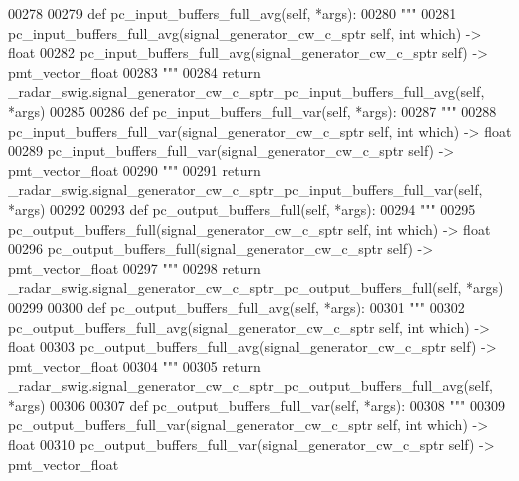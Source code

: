 \begin{DoxyCode}
{{{00278 
00279     \textcolor{keyword}{def }pc_input_buffers_full_avg(self, *args):
00280         \textcolor{stringliteral}{"""}
00281 \textcolor{stringliteral}{        pc\_input\_buffers\_full\_avg(signal\_generator\_cw\_c\_sptr self, int which) -> float}
00282 \textcolor{stringliteral}{        pc\_input\_buffers\_full\_avg(signal\_generator\_cw\_c\_sptr self) -> pmt\_vector\_float}
00283 \textcolor{stringliteral}{        """}
00284         \textcolor{keywordflow}{return} \_radar\_swig.signal\_generator\_cw\_c\_sptr\_pc\_input\_buffers\_full\_avg(self, *args)
00285 
00286     \textcolor{keyword}{def }pc_input_buffers_full_var(self, *args):
00287         \textcolor{stringliteral}{"""}
00288 \textcolor{stringliteral}{        pc\_input\_buffers\_full\_var(signal\_generator\_cw\_c\_sptr self, int which) -> float}
00289 \textcolor{stringliteral}{        pc\_input\_buffers\_full\_var(signal\_generator\_cw\_c\_sptr self) -> pmt\_vector\_float}
00290 \textcolor{stringliteral}{        """}
00291         \textcolor{keywordflow}{return} \_radar\_swig.signal\_generator\_cw\_c\_sptr\_pc\_input\_buffers\_full\_var(self, *args)
00292 
00293     \textcolor{keyword}{def }pc_output_buffers_full(self, *args):
00294         \textcolor{stringliteral}{"""}
00295 \textcolor{stringliteral}{        pc\_output\_buffers\_full(signal\_generator\_cw\_c\_sptr self, int which) -> float}
00296 \textcolor{stringliteral}{        pc\_output\_buffers\_full(signal\_generator\_cw\_c\_sptr self) -> pmt\_vector\_float}
00297 \textcolor{stringliteral}{        """}
00298         \textcolor{keywordflow}{return} \_radar\_swig.signal\_generator\_cw\_c\_sptr\_pc\_output\_buffers\_full(self, *args)
00299 
00300     \textcolor{keyword}{def }pc_output_buffers_full_avg(self, *args):
00301         \textcolor{stringliteral}{"""}
00302 \textcolor{stringliteral}{        pc\_output\_buffers\_full\_avg(signal\_generator\_cw\_c\_sptr self, int which) -> float}
00303 \textcolor{stringliteral}{        pc\_output\_buffers\_full\_avg(signal\_generator\_cw\_c\_sptr self) -> pmt\_vector\_float}
00304 \textcolor{stringliteral}{        """}
00305         \textcolor{keywordflow}{return} \_radar\_swig.signal\_generator\_cw\_c\_sptr\_pc\_output\_buffers\_full\_avg(self, *args)
00306 
00307     \textcolor{keyword}{def }pc_output_buffers_full_var(self, *args):
00308         \textcolor{stringliteral}{"""}
00309 \textcolor{stringliteral}{        pc\_output\_buffers\_full\_var(signal\_generator\_cw\_c\_sptr self, int which) -> float}
00310 \textcolor{stringliteral}{        pc\_output\_buffers\_full\_var(signal\_generator\_cw\_c\_sptr self) -> pmt\_vector\_float}
}}}
\end{DoxyCode}
